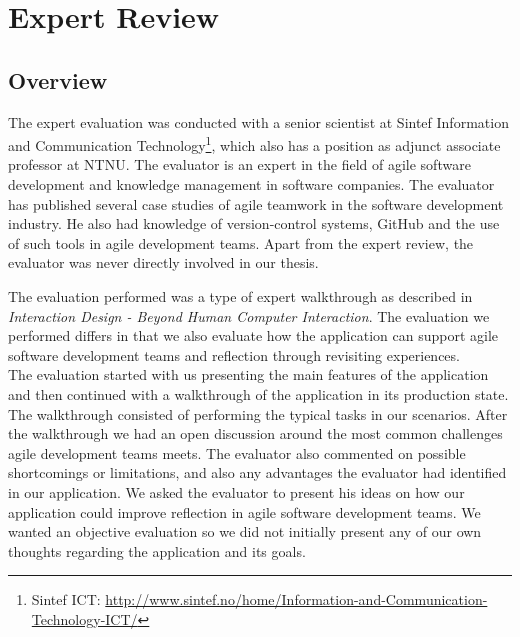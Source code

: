 \chapter{Expert Review}
\section{Overview}
The expert evaluation was conducted with a senior scientist at Sintef Information and Communication Technology\footnote{Sintef ICT: \url{http://www.sintef.no/home/Information-and-Communication-Technology-ICT/}}, which also has a position as adjunct associate professor at NTNU. The evaluator is an expert in the field of agile software development and knowledge management in software companies. The evaluator has published several case studies of agile teamwork in the software development industry. He also had knowledge of version-control systems, GitHub and the use of such tools in agile development teams. Apart from the expert review, the evaluator was never directly involved in our thesis.

The evaluation performed was a type of expert walkthrough as described in \emph{Interaction Design - Beyond Human Computer Interaction}\cite{rogers2011interaction}. The evaluation we performed differs in that we also evaluate how the application can support agile software development teams and reflection through revisiting experiences. \\ 
The evaluation started with us presenting the main features of the application and then continued with a walkthrough of the application in its production state. The walkthrough consisted of performing the typical tasks in our scenarios. After the walkthrough we had an open discussion around the most common challenges agile development teams meets.  The evaluator also commented on possible shortcomings or limitations, and also any advantages the evaluator had identified in our application. We asked the evaluator to present his ideas on how our application could improve reflection in agile software development teams. We wanted an objective evaluation so we did not initially present any of our own thoughts regarding the application and its goals. \\

